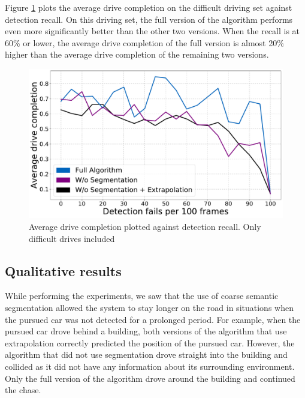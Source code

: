 \documentclass{ctuthesis/ctuthesis}
\begin{document}
Figure \ref{f:detection_recall_difficult} plots the average drive completion on the difficult driving set against detection recall. On this driving set, the full version of the algorithm performs even more significantly better than the other two versions. When the recall is at 60\% or lower, the average drive completion of the full version is almost 20\% higher than the average drive completion of the remaining two versions.

\begin{figure}[]
    \centering
    \includegraphics[width=1\textwidth]{images/recall_chart7_difficult.pdf}
    
    \caption{Average drive completion plotted against detection recall. Only difficult drives included}\label{f:detection_recall_difficult}
\end{figure}


\subsection{Qualitative results}
While performing the experiments, we saw that the use of coarse semantic segmentation allowed the system to stay longer on the road in situations when the pursued car was not detected for a prolonged period. For example, when the pursued car drove behind a building, both versions of the algorithm that use extrapolation correctly predicted the position of the pursued car. However, the algorithm that did not use segmentation drove straight into the building and collided as it did not have any information about its surrounding environment. Only the full version of the algorithm drove around the building and continued the chase.


\end{document}
